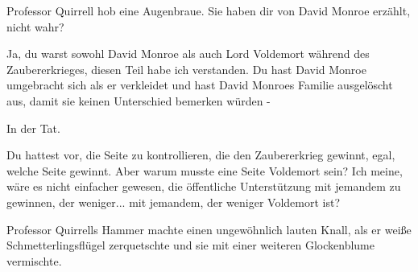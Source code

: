 Professor Quirrell hob eine Augenbraue. \glqq{}Sie haben dir von David Monroe
erzählt, nicht wahr?\grqq{}

\glqq{}Ja, du warst sowohl David Monroe als auch Lord Voldemort während des
Zaubererkrieges, diesen Teil habe ich verstanden. Du hast David Monroe
umgebracht sich als er verkleidet und hast David Monroes Familie ausgelöscht
aus, damit sie keinen Unterschied bemerken würden -\grqq{}

\glqq{}In der Tat.\grqq{}

\glqq{}Du hattest vor, die Seite zu kontrollieren, die den Zaubererkrieg gewinnt,
egal, welche Seite gewinnt. Aber warum musste eine Seite Voldemort sein? Ich
meine, wäre es nicht einfacher gewesen, die öffentliche Unterstützung mit
jemandem zu gewinnen, der weniger... mit jemandem, der weniger Voldemort
ist?\grqq{}

Professor Quirrells Hammer machte einen ungewöhnlich lauten Knall, als er weiße
Schmetterlingsflügel zerquetschte und sie mit einer weiteren Glockenblume
vermischte.

